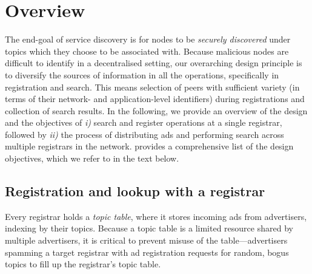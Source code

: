 
\section{Overview}

The end-goal of service discovery is for nodes to be \textit{securely discovered} under topics which they choose to be associated with. Because malicious nodes are difficult to identify in a decentralised setting, our overarching design principle is to diversify the sources of information in all the operations, specifically in registration and search. This means selection of peers with sufficient variety (in terms of their network- and application-level identifiers) during registrations and collection of search results. In the following, we provide an overview of the design and the objectives of \textit{i)} search and register operations at a single registrar, followed by \textit{ii)} the process of distributing ads and performing search across multiple registrars in the network.  provides a comprehensive list of the design objectives, which we refer to in the text below.


\subsection{Registration and lookup with a registrar}

Every registrar holds a \emph{topic table}, where it stores incoming ads from advertisers, indexing by their topics. Because a topic table is a limited resource shared by multiple advertisers, it is critical to prevent misuse of the table---\eg advertisers spamming a target registrar with ad registration requests for random, bogus topics to fill up the registrar's topic table. %

